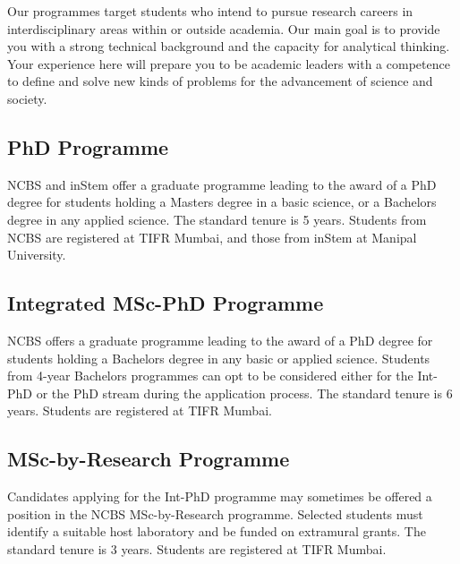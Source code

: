 \documentclass[a4paper,10pt]{article}
\begin{document}
Our programmes target students who intend to pursue research careers in interdisciplinary
areas within or outside academia. Our main goal is to provide you with a strong technical
background and the capacity for analytical thinking. Your experience here will prepare you
to be academic leaders with a competence to define and solve new kinds of problems for the
advancement of science and society.

\subsection{PhD Programme}
NCBS and inStem offer a graduate programme leading to the award of a
PhD degree for students holding a Masters degree in a basic science, or a Bachelors degree
in any applied science. The standard tenure is 5 years. Students from NCBS are registered at
TIFR Mumbai, and those from inStem at Manipal University.

\subsection{Integrated MSc-PhD Programme}
NCBS offers a graduate programme leading to the
award of a PhD degree for students holding a Bachelors degree in any basic or applied
science. Students from 4-year Bachelors programmes can opt to be considered either for the
Int-PhD or the PhD stream during the application process. The standard tenure is 6 years.
Students are registered at TIFR Mumbai.

\subsection{MSc-by-Research Programme}
Candidates applying for the Int-PhD programme may
sometimes be offered a position in the NCBS MSc-by-Research programme. Selected
students must identify a suitable host laboratory and be funded on extramural grants. The
standard tenure is 3 years. Students are registered at TIFR Mumbai.
\end{document}
